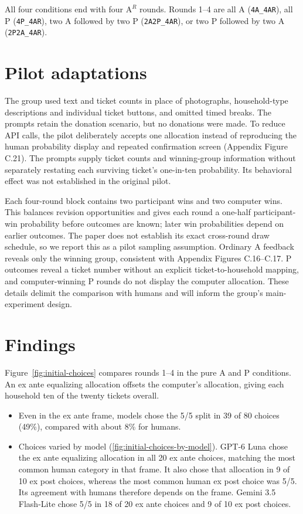 \documentclass[12pt,letterpaper]{article}
\begin{document}
All four conditions end with four $\mathrm{A}^{R}$ rounds. Rounds 1--4 are all A (\texttt{4A\_4AR}), all P (\texttt{4P\_4AR}), two A followed by two P (\texttt{2A2P\_4AR}), or two P followed by two A (\texttt{2P2A\_4AR}).

\section{Pilot adaptations}
The group used text and ticket counts in place of photographs, household-type descriptions and individual ticket buttons, and omitted timed breaks. The prompts retain the donation scenario, but no donations were made. To reduce API calls, the pilot deliberately accepts one allocation instead of reproducing the human probability display and repeated confirmation screen (Appendix Figure C.21). The prompts supply ticket counts and winning-group information without separately restating each surviving ticket's one-in-ten probability. Its behavioral effect was not established in the original pilot.

Each four-round block contains two participant wins and two computer wins. This balances revision opportunities and gives each round a one-half participant-win probability before outcomes are known; later win probabilities depend on earlier outcomes. The paper does not establish its exact cross-round draw schedule, so we report this as a pilot sampling assumption. Ordinary A feedback reveals only the winning group, consistent with Appendix Figures C.16--C.17. P outcomes reveal a ticket number without an explicit ticket-to-household mapping, and computer-winning P rounds do not display the computer allocation. These details delimit the comparison with humans and will inform the group's main-experiment design.

\section{Findings}

Figure~\ref{fig:initial-choices} compares rounds 1--4 in the pure A and P conditions. An ex ante equalizing allocation offsets the computer's allocation, giving each household ten of the twenty tickets overall.
\begin{itemize}
    \item Even in the ex ante frame, models chose the 5/5 split in 39 of 80 choices (49\%), compared with about 8\% for humans.
    \item Choices varied by model (\autoref{fig:initial-choices-by-model}). GPT-6 Luna chose the ex ante equalizing allocation in all 20 ex ante choices, matching the most common human category in that frame. It also chose that allocation in 9 of 10 ex post choices, whereas the most common human ex post choice was 5/5. Its agreement with humans therefore depends on the frame. Gemini 3.5 Flash-Lite chose 5/5 in 18 of 20 ex ante choices and 9 of 10 ex post choices.
\end{itemize}
\end{document}
